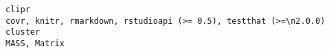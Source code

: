 \documentclass[
  letterpaper,
  DIV=11,
  numbers=noendperiod]{scrreprt}
\begin{document}
\begin{verbatim}
clipr                                                                                                                                                                                                                                                                                                                                                                                                                                                                                                                                                                                                                                                                                                                                                                                                                                                                                                                                                                                                                                                                                                                                                                                                                                       covr, knitr, rmarkdown, rstudioapi (>= 0.5), testthat (>=\n2.0.0)
cluster                                                                                                                                                                                                                                                                                                                                                                                                                                                                                                                                                                                                                                                                                                                                                                                                                                                                                                                                                                                                                                                                                                                                                                                                                                                                                          MASS, Matrix

\end{verbatim}
\end{document}
